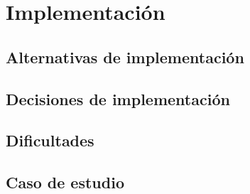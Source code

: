 \chapter{Implementación}
\label{Implementacion}

\section{Alternativas de implementación}
\label{Implementacion:Alternativas}

\section{Decisiones de implementación}
\label{Implementacion:Decisiones}

\section{Dificultades}
\label{Implementacion:Dificultades}

\section{Caso de estudio}
\label{Implementacion:CasoEstudio}
